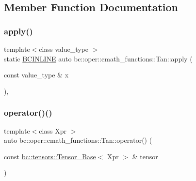 \subsection{Member Function Documentation}
\mbox{\label{structbc_1_1oper_1_1cmath__functions_1_1Tan_aff655c2e28a1ded1f09716cd48663c7c}} 
\subsubsection{\texorpdfstring{apply()}{apply()}}
{\footnotesize\ttfamily template$<$class value\+\_\+type $>$ \\
static \hyperlink{common_8h_a6699e8b0449da5c0fafb878e59c1d4b1}{B\+C\+I\+N\+L\+I\+NE} auto bc\+::oper\+::cmath\+\_\+functions\+::\+Tan\+::apply (\begin{DoxyParamCaption}\item[{const value\+\_\+type \&}]{x }\end{DoxyParamCaption})\hspace{0.3cm}{\ttfamily [inline]}, {\ttfamily [static]}}

\mbox{\label{structbc_1_1oper_1_1cmath__functions_1_1Tan_a50f4439cd26a0ac9542e9087678abb03}} 
\subsubsection{\texorpdfstring{operator()()}{operator()()}\hspace{0.1cm}{\footnotesize\ttfamily [1/3]}}
{\footnotesize\ttfamily template$<$class Xpr $>$ \\
auto bc\+::oper\+::cmath\+\_\+functions\+::\+Tan\+::operator() (\begin{DoxyParamCaption}\item[{const \hyperlink{classbc_1_1tensors_1_1Tensor__Base}{bc\+::tensors\+::\+Tensor\+\_\+\+Base}$<$ Xpr $>$ \&}]{tensor }\end{DoxyParamCaption})\hspace{0.3cm}{\ttfamily [inline]}}


